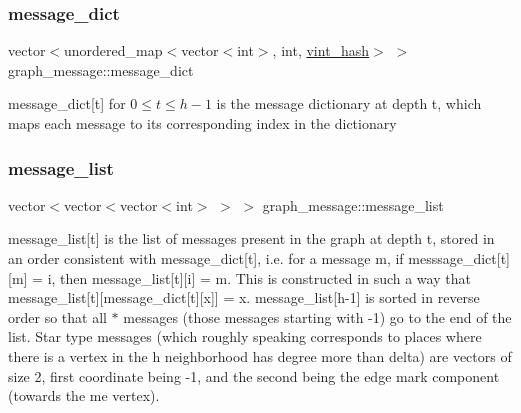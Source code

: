 \mbox{\label{classgraph__message_ab54d89b122c2b1322da0d5db2043fb84}} 
\subsubsection{\texorpdfstring{message\+\_\+dict}{message\_dict}}
{\footnotesize\ttfamily vector$<$unordered\+\_\+map$<$vector$<$int$>$, int, \hyperlink{structvint__hash}{vint\+\_\+hash}$>$ $>$ graph\+\_\+message\+::message\+\_\+dict}



message\+\_\+dict\mbox{[}t\mbox{]} for $0 \leq t \leq h-1$ is the message dictionary at depth t, which maps each message to its corresponding index in the dictionary 

\mbox{\label{classgraph__message_aa17fdb629b423343edfafa97252763ef}} 
\subsubsection{\texorpdfstring{message\+\_\+list}{message\_list}}
{\footnotesize\ttfamily vector$<$vector$<$vector$<$int$>$ $>$ $>$ graph\+\_\+message\+::message\+\_\+list}



message\+\_\+list\mbox{[}t\mbox{]} is the list of messages present in the graph at depth t, stored in an order consistent with message\+\_\+dict\mbox{[}t\mbox{]}, i.\+e. for a message m, if messsage\+\_\+dict\mbox{[}t\mbox{]}\mbox{[}m\mbox{]} = i, then message\+\_\+list\mbox{[}t\mbox{]}\mbox{[}i\mbox{]} = m. This is constructed in such a way that message\+\_\+list\mbox{[}t\mbox{]}\mbox{[}message\+\_\+dict\mbox{[}t\mbox{]}\mbox{[}x\mbox{]}\mbox{]} = x. message\+\_\+list\mbox{[}h-\/1\mbox{]} is sorted in reverse order so that all $\ast$ messages (those messages starting with -\/1) go to the end of the list. Star type messages (which roughly speaking corresponds to places where there is a vertex in the h neighborhood has degree more than delta) are vectors of size 2, first coordinate being -\/1, and the second being the edge mark component (towards the \textquotesingle{}me\textquotesingle{} vertex). 

